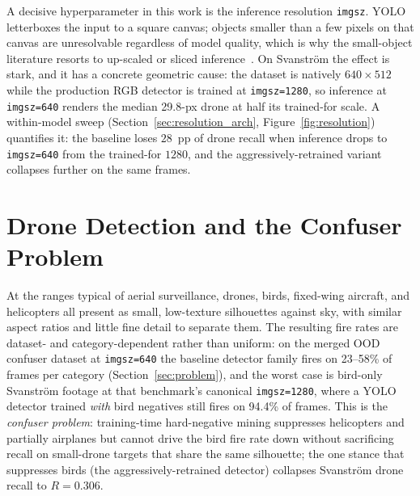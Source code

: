 A decisive hyperparameter in this work is the inference resolution \texttt{imgsz}. YOLO letterboxes the input to a square canvas; objects smaller than a few pixels on that canvas are unresolvable regardless of model quality, which is why the small-object literature resorts to up-scaled or sliced inference~\cite{akyon2022sahi}. On Svanstr\"om the effect is stark, and it has a concrete geometric cause: the dataset is natively $640\times512$ while the production RGB detector is trained at \texttt{imgsz=1280}, so inference at \texttt{imgsz=640} renders the median 29.8-px drone at half its trained-for scale. A within-model sweep (Section~\ref{sec:resolution_arch}, Figure~\ref{fig:resolution}) quantifies it: the baseline loses $28$~pp of drone recall when inference drops to \texttt{imgsz=640} from the trained-for $1280$, and the aggressively-retrained variant collapses further on the same frames.

\section{Drone Detection and the Confuser Problem}
\label{sec:lit_drone}

At the ranges typical of aerial surveillance, drones, birds, fixed-wing aircraft, and helicopters all present as small, low-texture silhouettes against sky, with similar aspect ratios and little fine detail to separate them. The resulting fire rates are dataset- and category-dependent rather than uniform: on the merged OOD confuser dataset at \texttt{imgsz=640} the baseline detector family fires on 23--58\% of frames per category (Section~\ref{sec:problem}), and the worst case is bird-only Svanstr\"om footage at that benchmark's canonical \texttt{imgsz=1280}, where a YOLO detector trained \emph{with} bird negatives still fires on 94.4\% of frames. This is the \emph{confuser problem}: training-time hard-negative mining suppresses helicopters and partially airplanes but cannot drive the bird fire rate down without sacrificing recall on small-drone targets that share the same silhouette; the one stance that suppresses birds (the aggressively-retrained detector) collapses Svanstr\"om drone recall to $R=0.306$.

